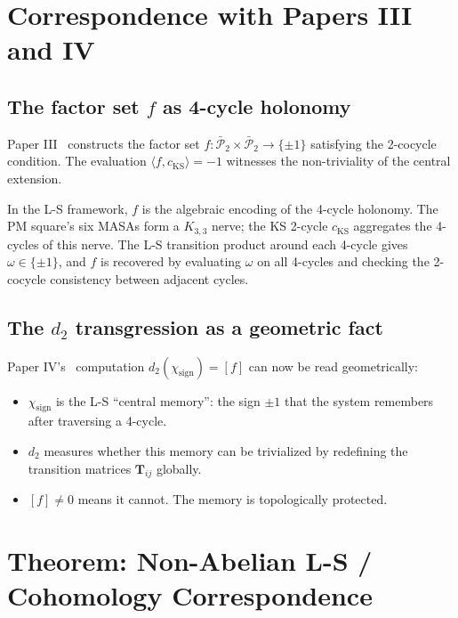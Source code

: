 \documentclass[11pt]{article}
\begin{document}
\section{Correspondence with Papers III and IV}
\label{sec:correspondence}

\subsection{The factor set $f$ as 4-cycle holonomy}
\label{sec:factor-set}

Paper III~\cite{PaperIII} constructs the factor set
$f: \bar{\mathcal{P}}_2 \times \bar{\mathcal{P}}_2 \to \{\pm 1\}$ satisfying
the 2-cocycle condition. The evaluation $\langle f, c_{\text{KS}} \rangle = -1$
witnesses the non-triviality of the central extension.

In the L-S framework, $f$ is the algebraic encoding of the 4-cycle holonomy.
The PM square's six MASAs form a $K_{3,3}$ nerve; the KS 2-cycle $c_{\text{KS}}$
aggregates the 4-cycles of this nerve. The L-S transition product around each
4-cycle gives $\omega \in \{\pm 1\}$, and $f$ is recovered by evaluating
$\omega$ on all 4-cycles and checking the 2-cocycle consistency between
adjacent cycles.

\subsection{The $d_2$ transgression as a geometric fact}
\label{sec:geometric-d2}

Paper IV's~\cite{PaperIV} computation $d_2(\chi_{\text{sign}}) = [f]$ can now be read
geometrically:
\begin{itemize}
  \item $\chi_{\text{sign}}$ is the L-S ``central memory'': the sign $\pm 1$
    that the system remembers after traversing a 4-cycle.
  \item $d_2$ measures whether this memory can be trivialized by redefining
    the transition matrices $\mathbf{T}_{ij}$ globally.
  \item $[f] \neq 0$ means it cannot. The memory is topologically protected.
\end{itemize}

\section{Theorem: Non-Abelian L-S / Cohomology Correspondence}
\label{sec:theorem}
\end{document}
